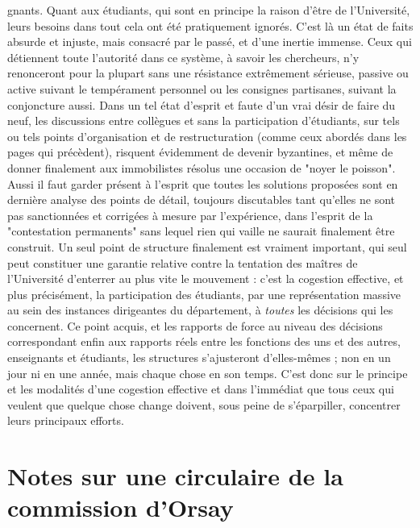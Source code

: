 \documentclass[11pt,a4paper]{article}
\begin{document}

gnants. Quant aux étudiants, qui sont en principe la raison d'être de l'Université, leurs besoins dans tout cela ont été pratiquement ignorés. C'est là un état de faits absurde et injuste, mais consacré par le passé, et d'une inertie immense. Ceux qui détiennent toute l'autorité dans ce système, à savoir les chercheurs, n'y renonceront pour la plupart sans une résistance extrêmement sérieuse, passive ou active suivant le tempérament personnel ou les consignes partisanes, suivant la conjoncture aussi. Dans un tel état d'esprit et faute d'un vrai désir de faire du neuf, les discussions entre collègues et sans la participation d'étudiants, sur tels ou tels points d'organisation et de restructuration (comme ceux abordés dans les pages qui précèdent), risquent évidemment de devenir byzantines, et même de donner finalement aux immobilistes résolus une occasion de "noyer le poisson". Aussi il faut garder présent à l'esprit que toutes les solutions proposées sont en dernière analyse des points de détail, toujours discutables tant qu'elles ne sont pas sanctionnées et corrigées à mesure par l'expérience, dans l'esprit de la "contestation permanents" sans lequel rien qui vaille ne saurait finalement être construit. Un seul point de structure finalement est vraiment important, qui seul peut constituer une garantie relative contre la tentation des maîtres de l'Université d'enterrer au plus vite le mouvement : c'est la cogestion effective, et plus précisément, la participation des étudiants, par une représentation massive au sein des instances dirigeantes du département, à \emph{toutes} les décisions qui les concernent. Ce point acquis, et les rapports de force au niveau des décisions correspondant enfin aux rapports réels entre les fonctions des uns et des autres, enseignants et étudiants, les structures s'ajusteront d'elles-mêmes ; non en un jour ni en une année, mais chaque chose en son temps. C'est donc sur le principe et les modalités d'une cogestion effective et dans l'immédiat que tous ceux qui veulent que quelque chose change doivent, sous peine de s'éparpiller, concentrer leurs principaux efforts.


\section{Notes sur une circulaire de la commission d'Orsay}
\end{document}
